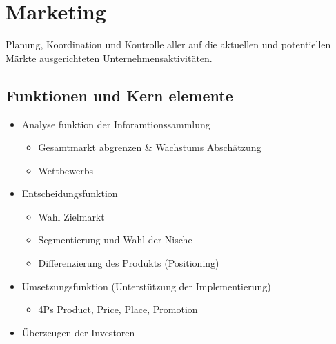 \documentclass[a4paper]{article}
\begin{document}
    \section{Marketing}
    \begin{definition}
        [Marketing] Planung, Koordination und Kontrolle aller auf die aktuellen und potentiellen Märkte ausgerichteten Unternehmensaktivitäten.
    \end{definition}

    \subsection{Funktionen und Kern elemente}
    \begin{itemize}
        \item Analyse funktion der Inforamtionssammlung
        \begin{itemize}
            \item Gesamtmarkt abgrenzen \& Wachstums Abschätzung
        \item Wettbewerbs
        \end{itemize} 
        \item Entscheidungsfunktion 
        \begin{itemize}
        \item Wahl Zielmarkt
        \item Segmentierung und Wahl der Nische
        \item Differenzierung des Produkts (Positioning)
            
        \end{itemize}
        \item Umsetzungsfunktion (Unterstützung der Implementierung)
        \begin{itemize}
              \item 4Ps Product, Price, Place, Promotion
        \end{itemize}
        \item Überzeugen der Investoren
    \end{itemize}
\end{document}
